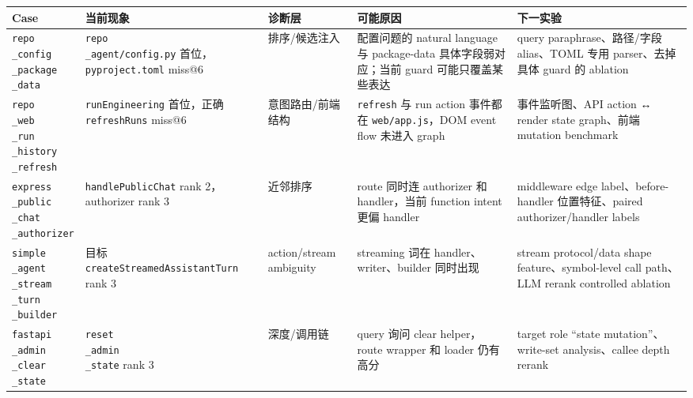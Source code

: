 \documentclass[UTF8,12pt,openany]{ctexbook}
\begin{document}
\begin{center}
\small
\begin{longtable}{|p{}|p{}|p{}|p{}|p{}|}
\toprule
Case & 当前现象 & 诊断层 & 可能原因 & 下一实验 \\
\midrule
\texttt{repo\\_config\\_package\\_data} & \texttt{repo\\_agent/config.py} 首位，\texttt{pyproject.toml} miss@6 & 排序/候选注入 & 配置问题的 natural language 与 package-data 具体字段弱对应；当前 guard 可能只覆盖某些表达 & query paraphrase、路径/字段 alias、TOML 专用 parser、去掉具体 guard 的 ablation \\
\texttt{repo\\_web\\_run\\_history\\_refresh} & \texttt{runEngineering} 首位，正确 \texttt{refreshRuns} miss@6 & 意图路由/前端结构 & \texttt{refresh} 与 run action 事件都在 \texttt{web/app.js}，DOM event flow 未进入 graph & 事件监听图、API action ↔ render state graph、前端 mutation benchmark \\
\texttt{express\\_public\\_chat\\_authorizer} & \texttt{handlePublicChat} rank 2，authorizer rank 3 & 近邻排序 & route 同时连 authorizer 和 handler，当前 function intent 更偏 handler & middleware edge label、before-handler 位置特征、paired authorizer/handler labels \\
\texttt{simple\\_agent\\_stream\\_turn\\_builder} & 目标 \texttt{createStreamedAssistantTurn} rank 3 & action/stream ambiguity & streaming 词在 handler、writer、builder 同时出现 & stream protocol/data shape feature、symbol-level call path、LLM rerank controlled ablation \\
\texttt{fastapi\\_admin\\_clear\\_state} & \texttt{reset\\_admin\\_state} rank 3 & 深度/调用链 & query 询问 clear helper，route wrapper 和 loader 仍有高分 & target role “state mutation”、write-set analysis、callee depth rerank \\
\bottomrule
\end{longtable}
\end{center}
\end{document}
